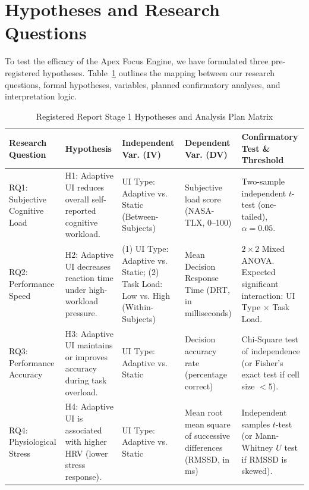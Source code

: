 \section{Hypotheses and Research Questions}
\label{sec:hypotheses}

To test the efficacy of the Apex Focus Engine, we have formulated three pre-registered hypotheses. Table~\ref{tab:hypotheses} outlines the mapping between our research questions, formal hypotheses, variables, planned confirmatory analyses, and interpretation logic.

\begin{table}[H]
\centering
\small
\caption{Registered Report Stage 1 Hypotheses and Analysis Plan Matrix}
\label{tab:hypotheses}
\vspace{0.2cm}
\begin{tabularx}{\textwidth}{|p{2.5cm}|p{2.8cm}|>{\raggedright\arraybackslash}X|>{\raggedright\arraybackslash}X|p{3.5cm}|}
\hline
\rowcolor{tablehead}
\textbf{Research Question} & \textbf{Hypothesis} & \textbf{Independent Var. (IV)} & \textbf{Dependent Var. (DV)} & \textbf{Confirmatory Test \& Threshold} \\
\hline
RQ1: Subjective Cognitive Load & H1: Adaptive UI reduces overall self-reported cognitive workload. & UI Type: Adaptive vs. Static (Between-Subjects) & Subjective load score (NASA-TLX, 0--100) & Two-sample independent $t$-test (one-tailed), $\alpha = 0.05$. \\
\hline
RQ2: Performance Speed & H2: Adaptive UI decreases reaction time under high-workload pressure. & (1) UI Type: Adaptive vs. Static; (2) Task Load: Low vs. High (Within-Subjects) & Mean Decision Response Time (DRT, in milliseconds) & $2\times 2$ Mixed ANOVA. Expected significant interaction: UI Type $\times$ Task Load. \\
\hline
RQ3: Performance Accuracy & H3: Adaptive UI maintains or improves accuracy during task overload. & UI Type: Adaptive vs. Static & Decision accuracy rate (percentage correct) & Chi-Square test of independence (or Fisher's exact test if cell size $< 5$). \\
\hline
RQ4: Physiological Stress & H4: Adaptive UI is associated with higher HRV (lower stress response). & UI Type: Adaptive vs. Static & Mean root mean square of successive differences (RMSSD, in ms) & Independent samples $t$-test (or Mann-Whitney $U$ test if RMSSD is skewed). \\
\hline
\end{tabularx}
\end{table}

